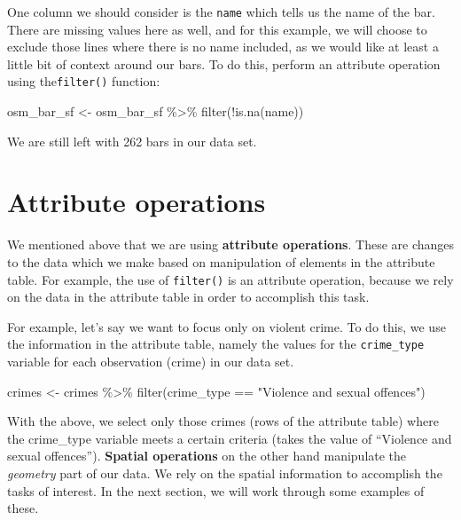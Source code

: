 \documentclass[
  krantz2]{krantz}
\makeatletter
\newenvironment{Shaded}{\begin{snugshade}}{\end{snugshade}}
\newcommand{\FunctionTok}[1]{\textcolor[rgb]{0,0,0}{#1}}
\newcommand{\NormalTok}[1]{#1}
\newcommand{\OtherTok}[1]{\textcolor[rgb]{0.37,0.37,0.37}{#1}}
\newcommand{\SpecialCharTok}[1]{\textcolor[rgb]{0,0,0}{#1}}
\newcommand{\StringTok}[1]{\textcolor[rgb]{0.5,0.5,0.5}{#1}}
\newenvironment{kframe}{%
\medskip{}
\setlength{\fboxsep}{.8em}
 \def\at@end@of@kframe{}%
 \ifinner\ifhmode%
  \def\at@end@of@kframe{\end{minipage}}%
  \begin{minipage}{\columnwidth}%
 \fi\fi%
 \def\FrameCommand##1{\hskip\@totalleftmargin \hskip-\fboxsep
 \colorbox{shadecolor}{##1}\hskip-\fboxsep
     \hskip-\linewidth \hskip-\@totalleftmargin \hskip\columnwidth}%
 \MakeFramed {\advance\hsize-\width
   \@totalleftmargin\z@ \linewidth\hsize
   \@setminipage}}%
 {\par\unskip\endMakeFramed%
 \at@end@of@kframe}
\renewenvironment{Shaded}{\begin{kframe}}{\end{kframe}}
\makeatother
\begin{document}
One column we should consider is the \texttt{name} which tells us the name of the bar. There are missing values here as well, and for this example, we will choose to exclude those lines where there is no name included, as we would like at least a little bit of context around our bars. To do this, perform an attribute operation using the\texttt{filter()} function:

\begin{Shaded}
\begin{Highlighting}[]
\NormalTok{osm\_bar\_sf }\OtherTok{\textless{}{-}}\NormalTok{ osm\_bar\_sf }\SpecialCharTok{\%\textgreater{}\%} \FunctionTok{filter}\NormalTok{(}\SpecialCharTok{!}\FunctionTok{is.na}\NormalTok{(name))}
\end{Highlighting}
\end{Shaded}

We are still left with 262 bars in our data set.

\hypertarget{attribute-operations}{%
\section{Attribute operations}\label{attribute-operations}}

We mentioned above that we are using \textbf{attribute operations}. These are changes to the data which we make based on manipulation of elements in the attribute table. For example, the use of \texttt{filter()} is an attribute operation, because we rely on the data in the attribute table in order to accomplish this task.

For example, let's say we want to focus only on violent crime. To do this, we use the information in the attribute table, namely the values for the \texttt{crime\_type} variable for each observation (crime) in our data set.

\begin{Shaded}
\begin{Highlighting}[]
\NormalTok{crimes }\OtherTok{\textless{}{-}}\NormalTok{ crimes }\SpecialCharTok{\%\textgreater{}\%} 
  \FunctionTok{filter}\NormalTok{(crime\_type }\SpecialCharTok{==} \StringTok{"Violence and sexual offences"}\NormalTok{)}
\end{Highlighting}
\end{Shaded}

With the above, we select only those crimes (rows of the attribute table) where the crime\_type variable meets a certain criteria (takes the value of ``Violence and sexual offences''). \textbf{Spatial operations} on the other hand manipulate the \emph{geometry} part of our data. We rely on the spatial information to accomplish the tasks of interest. In the next section, we will work through some examples of these.
\end{document}
